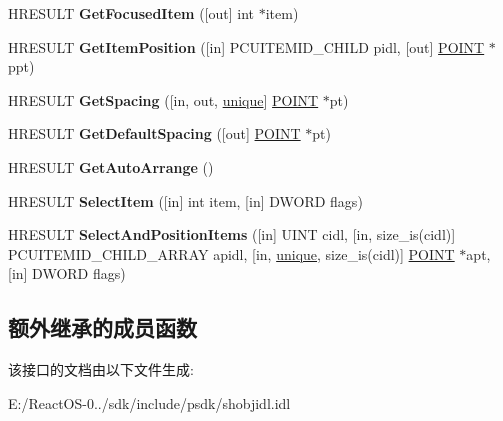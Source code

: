 \begin{DoxyCompactItemize}
\item 
\mbox{\label{interface_i_folder_view_ae158a5e41221e2d9aa429e564d419ea6}} 
H\+R\+E\+S\+U\+LT {\bfseries Get\+Focused\+Item} (\mbox{[}out\mbox{]} int $\ast$item)
\item 
\mbox{\label{interface_i_folder_view_afe36d25130b942c4d4fda4dc4320db91}} 
H\+R\+E\+S\+U\+LT {\bfseries Get\+Item\+Position} (\mbox{[}in\mbox{]} P\+C\+U\+I\+T\+E\+M\+I\+D\+\_\+\+C\+H\+I\+LD pidl, \mbox{[}out\mbox{]} \hyperlink{structtag_p_o_i_n_t}{P\+O\+I\+NT} $\ast$ppt)
\item 
\mbox{\label{interface_i_folder_view_af874c522192c74f0e9aeb014419a4b5b}} 
H\+R\+E\+S\+U\+LT {\bfseries Get\+Spacing} (\mbox{[}in, out, \hyperlink{interfaceunique}{unique}\mbox{]} \hyperlink{structtag_p_o_i_n_t}{P\+O\+I\+NT} $\ast$pt)
\item 
\mbox{\label{interface_i_folder_view_a2d26d35daf65a0bd359cdd1d52267dd6}} 
H\+R\+E\+S\+U\+LT {\bfseries Get\+Default\+Spacing} (\mbox{[}out\mbox{]} \hyperlink{structtag_p_o_i_n_t}{P\+O\+I\+NT} $\ast$pt)
\item 
\mbox{\label{interface_i_folder_view_afdce542124c0dc898b74785190c8e6e4}} 
H\+R\+E\+S\+U\+LT {\bfseries Get\+Auto\+Arrange} ()
\item 
\mbox{\label{interface_i_folder_view_a546bfa87d6f5721ec4b9b663d02745d0}} 
H\+R\+E\+S\+U\+LT {\bfseries Select\+Item} (\mbox{[}in\mbox{]} int item, \mbox{[}in\mbox{]} D\+W\+O\+RD flags)
\item 
\mbox{\label{interface_i_folder_view_a63eda50c1e45635c79cee1e4fdb661fb}} 
H\+R\+E\+S\+U\+LT {\bfseries Select\+And\+Position\+Items} (\mbox{[}in\mbox{]} U\+I\+NT cidl, \mbox{[}in, size\+\_\+is(cidl)\mbox{]} P\+C\+U\+I\+T\+E\+M\+I\+D\+\_\+\+C\+H\+I\+L\+D\+\_\+\+A\+R\+R\+AY apidl, \mbox{[}in, \hyperlink{interfaceunique}{unique}, size\+\_\+is(cidl)\mbox{]} \hyperlink{structtag_p_o_i_n_t}{P\+O\+I\+NT} $\ast$apt, \mbox{[}in\mbox{]} D\+W\+O\+RD flags)
\end{DoxyCompactItemize}
\subsection*{额外继承的成员函数}


该接口的文档由以下文件生成\+:\begin{DoxyCompactItemize}
\item 
E\+:/\+React\+O\+S-\/0../sdk/include/psdk/shobjidl.\+idl\end{DoxyCompactItemize}

